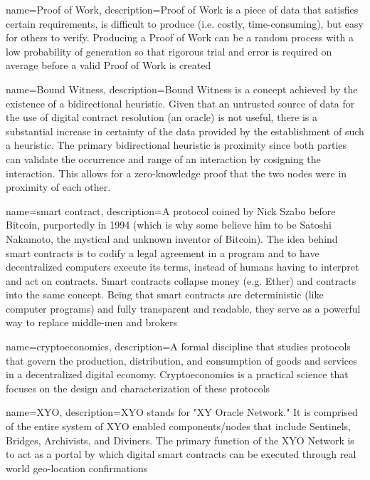 \documentclass{article}
\begin{document}
{
    name={Proof of Work},
    description={Proof of Work is a piece of data that satisfies certain requirements, is difficult to produce (i.e. costly, time-consuming), but easy for others to verify. Producing a Proof of Work can be a random process with a low probability of generation so that rigorous trial and error is required on average before a valid Proof of Work is created}
}

{
    name={Bound Witness},
    description={Bound Witness is a concept achieved by the existence of a bidirectional heuristic. Given that an untrusted source of data for the use of digital contract resolution (an oracle) is not useful, there is a substantial increase in certainty of the data provided by the establishment of such a heuristic. The primary bidirectional heuristic is proximity since both parties can validate the occurrence and range of an interaction by cosigning the interaction. This allows for a zero-knowledge proof that the two nodes were in proximity of each other.}
}

{
    name={smart contract},
    description={A protocol coined by Nick Szabo before Bitcoin, purportedly in 1994 (which is why some believe him to be Satoshi Nakamoto, the mystical and unknown inventor of Bitcoin). The idea behind smart contracts is to codify a legal agreement in a program and to have decentralized computers execute its terms, instead of humans having to interpret and act on contracts. Smart contracts collapse money (e.g. Ether) and contracts into the same concept. Being that smart contracts are deterministic (like computer programs) and fully transparent and readable, they serve as a powerful way to replace middle-men and brokers}
}

{
    name={cryptoeconomics},
    description={A formal discipline that studies protocols that govern the production, distribution, and consumption of goods and services in a decentralized digital economy. Cryptoeconomics is a practical science that focuses on the design and characterization of these protocols}
}

{
    name={XYO},
    description={XYO stands for "XY Oracle Network." It is comprised of the entire system of XYO enabled components/nodes that include Sentinels, Bridges, Archivists, and Diviners. The primary function of the XYO Network is to act as a portal by which digital smart contracts can be executed through real world geo-location confirmations}
}
\end{document}
